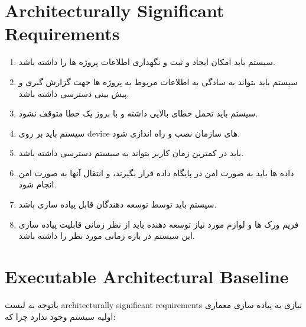 \documentclass{article}
\begin{document}
\newpage

\section{Architecturally Significant Requirements}
\begin{enumerate}
\item سیستم باید امکان ایجاد و ثبت و نگهداری اطلاعات پروژه ها را داشته باشد.
\item سیستم باید بتواند به سادگی به اطلاعات مربوط به پروژه ها جهت گزارش گیری و پیش بینی دسترسی داشته باشد.
\item سیستم باید تحمل خطای بالایی داشته و با بروز یک خطا متوقف نشود.
\item سیستم باید بر روی device های سازمان نصب و راه اندازی شود.
\item باید در کمترین زمان کاربر بتواند به سیستم دسترسی داشته باشد.
\item داده ها باید به صورت امن در پایگاه داده قرار بگیرند، و انتقال آنها به صورت امن انجام شود.
\item سیستم باید توسط توسعه دهندگان قابل پیاده سازی باشد.
\item فریم ورک ها و لوازم مورد نیاز توسعه دهنده باید از نظر زمانی قابلیت پیاده سازی این سیستم در بازه زمانی مورد نظر را داشته باشد.
\end{enumerate}

\vspace{0.5cm}
\section{Executable Architectural Baseline}
باتوجه به لیست architecturally significant requirements نیازی به پیاده سازی معماری اولیه سیستم وجود ندارد چرا که:
\end{document}
